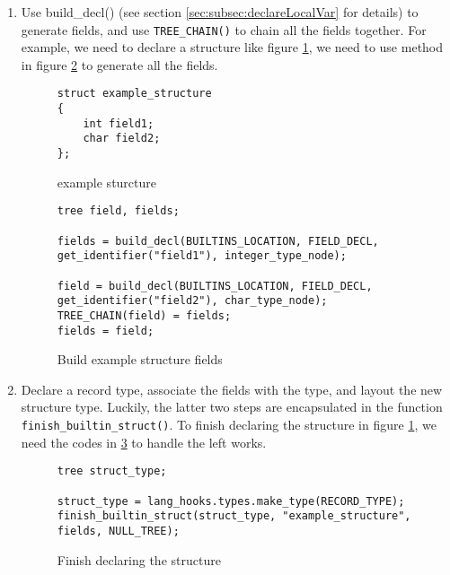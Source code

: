 \documentclass[11pt]{article}
\begin{document}
\begin{enumerate}
	\item Use build\_decl() (see section \ref{sec:subsec:declareLocalVar} for details) to generate fields, and use \texttt{TREE\_CHAIN()} to chain all the fields together. For example, we need to declare a structure like figure \ref{fig:exampleStructure}, we need to use method in figure \ref{fig:buildExmpleStructFields} to generate all the fields.


\begin{figure}[!htb]
\begin{lstlisting}[mathescape]
struct example_structure
{
	int field1;
	char field2;
};
\end{lstlisting}
\caption{example sturcture}
\label{fig:exampleStructure}
\end{figure}

\begin{figure}[!htb]
\begin{lstlisting}[mathescape]
tree field, fields;

fields = build_decl(BUILTINS_LOCATION, FIELD_DECL, get_identifier("field1"), integer_type_node);

field = build_decl(BUILTINS_LOCATION, FIELD_DECL, get_identifier("field2"), char_type_node);
TREE_CHAIN(field) = fields;
fields = field;
\end{lstlisting}
\caption{Build example structure fields}
\label{fig:buildExmpleStructFields}
\end{figure}

	\item Declare a record type, associate the fields with the type, and layout the new structure type. Luckily, the latter two steps are encapsulated in the function \texttt{finish\_builtin\_struct()}. To finish declaring the structure in figure \ref{fig:exampleStructure}, we need the codes in \ref{fig:finishDeclareStruct} to handle the left works.
	
\begin{figure}
\begin{lstlisting}[mathescape]
tree struct_type;

struct_type = lang_hooks.types.make_type(RECORD_TYPE);
finish_builtin_struct(struct_type, "example_structure", fields, NULL_TREE);
\end{lstlisting}
\caption{Finish declaring the structure}
\label{fig:finishDeclareStruct}
\end{figure}

\end{enumerate}
\end{document}
